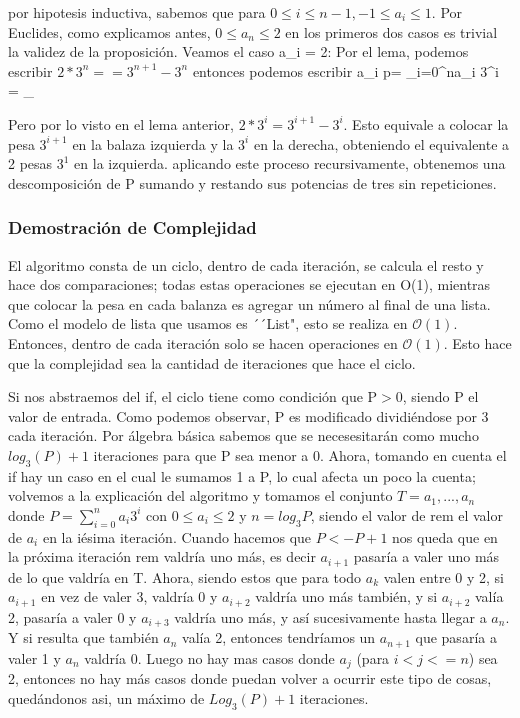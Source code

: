 \documentclass[spanish,12pt]{article}
\begin{document}
por hipotesis inductiva, sabemos que para $0\leq i \leq n-1, -1\leq a_{i}\leq 1$. Por Euclides, como explicamos antes, $0\leq a_{n} \leq 2 $ en los primeros dos casos es trivial la validez de la proposición. 
Veamos el caso a_{i} = 2:
  Por el lema, podemos escribir $2*3^{n}= = 3^{n+1}-3^{n}$  entonces  podemos escribir a_{i} p= \sum_{i=0}^{n}{a_i 3^{i}} = \sum_{ 


 Pero por lo visto en el lema anterior, $2*3^{i}= 3^{i+1}-3^{i}$. Esto equivale a colocar la pesa $3^{i+1}$ en la balaza izquierda y la $3^{i}$ en la derecha, obteniendo el equivalente a 2 pesas $3^{1}$ en la izquierda. aplicando este proceso recursivamente, obtenemos  una descomposición de P sumando y restando sus potencias de tres sin repeticiones.


\subsubsection{Demostración de Complejidad}

El algoritmo consta de un ciclo, dentro de cada iteración, se calcula el resto y hace dos comparaciones; todas estas operaciones se ejecutan en O(1), mientras que colocar la pesa en cada balanza
es agregar un número al final de una lista. Como el modelo de lista que usamos es ´´List", esto se realiza en $\mathcal{O}(1)$.
Entonces, dentro de cada iteración solo se hacen operaciones en $\mathcal{O}(1)$. Esto hace que la complejidad sea la cantidad de iteraciones que hace el ciclo.

Si nos abstraemos del if, el ciclo tiene como condición que P$>$0, siendo P el valor de entrada. Como podemos observar, P es modificado dividiéndose por 3 cada iteración. Por álgebra básica sabemos que se necesesitarán como mucho $log_3(P) + 1$ iteraciones para que P sea menor a 0.
Ahora, tomando en cuenta el if hay un caso en el cual le sumamos 1 a P, lo cual afecta un poco la cuenta; volvemos a la explicación del algoritmo y tomamos el conjunto $T = {a_1,...,a_n}$ 
donde  $P = \sum_{i=0}^{n} a_i3^i$ con $0 \leq a_i \leq 2$ y $n = log_{3}{P}$, siendo el valor de rem el valor de $a_i$ en la iésima iteración.
Cuando hacemos que $P<-P+1$ nos queda que en la próxima iteración rem valdría uno más, es decir $a_{i+1}$ pasaría a valer uno más de lo que valdría en T. Ahora,  siendo estos que para todo $a_k$
valen entre 0 y 2, si $a_{i+1}$ en vez de valer 3, valdría 0 y $a_{i+2}$ valdría uno más también, y si  $a_{i+2}$ valía 2, pasaría a valer 0 y  $a_{i+3}$ valdría uno más, y así sucesivamente hasta llegar a $a_n$.
Y si resulta que también $a_n$ valía 2, entonces tendríamos un $a_{n+1}$ que pasaría a valer 1 y $a_n$ valdría 0.
Luego no hay mas casos donde $a_j$ (para $i<j<=n$) sea 2, entonces no hay más casos donde puedan volver a ocurrir este tipo de cosas, quedándonos asi, un máximo de $Log_3(P)+1$ iteraciones.

}
\end{document}
